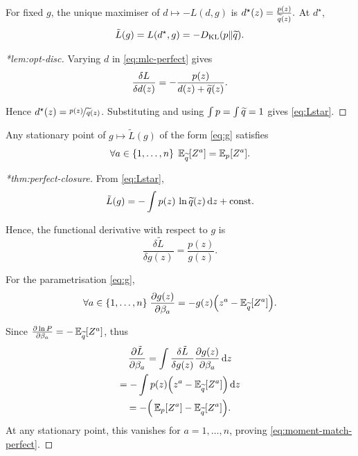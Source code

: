 \begin{theorem}
\noproofref
For fixed $g$, the unique maximiser of $d\mapsto -L(d,g)$ is
\(
d^\star(z)=\frac{p(z)}{\widetilde{q}(z)}.
\)
At $d^\star$,
\begin{equation}
    \tilde L(g) = L(d^\star,g) = - D_{\mathrm{KL}}\qty(p\|\widetilde{q}).
\end{equation}
\end{theorem}

\begin{proof}[*lem:opt-disc]
Varying $d$ in \cref{eq:mlc-perfect} gives
\[
    \frac{\delta L}{\delta d(z)} = -\frac{p(z)}{d(z)+\widetilde{q}(z)}.
\]

Hence $d^\star(z)=\nicefrac{p(z)}{\widetilde{q}(z)}$. Substituting and using $\int p=\int \widetilde{q}=1$ gives \cref{eq:Lstar}.
\end{proof}

\begin{theorem}
\noproofref
Any stationary point of $g\mapsto \tilde L(g)$ of the form \cref{eq:g} satisfies
\begin{equation}
    \forall a\in \{1,\dots, n\}\;\operatorname{\mathbb{E}}_{\widetilde{q}}[Z^a] = \operatorname{\mathbb{E}}_{p}[Z^a].
\end{equation}
\end{theorem}

\begin{proof}[*thm:perfect-closure]
From \cref{eq:Lstar},
\[
    \tilde L(g) = -\int p(z)\,\ln\widetilde{q}(z)\,\dd z + \mathrm{const}.
\]

    Hence, the functional derivative with respect to $g$ is
    \begin{equation}
        \frac{\delta \tilde L}{\delta g(z)} =\frac{p(z)}{g(z)}.
    \end{equation}
    
For the parametrisation \cref{eq:g},
\begin{equation}
    \forall a\in \{1,\dots, n\}\;\frac{\partial g(z)}{\partial \beta_a} = -g(z)\qty(z^a - \operatorname{\mathbb{E}}_{\widetilde{q}}[Z^a]).
\end{equation}

Since $\pdv{\ln P}{\beta_a} = -\operatorname{\mathbb{E}}_{\widetilde{q}}[Z^a]$, thus
\begin{gather}
    \frac{\partial \tilde L}{\partial \beta_a}
= \int \frac{\delta \tilde L}{\delta g(z)}\frac{\partial g(z)}{\partial \beta_a}\,\dd z\\
= -\int p(z)\Big(z^a - \operatorname{\mathbb{E}}_{\widetilde{q}}[Z^a]\Big)\,\dd z\\
= -\Big(\operatorname{\mathbb{E}}_{p}[Z^a]-\operatorname{\mathbb{E}}_{\widetilde{q}}[Z^a]\Big).
\end{gather}
At any stationary point, this vanishes for $a=1,\dots,n$, proving \cref{eq:moment-match-perfect}.
\end{proof}

